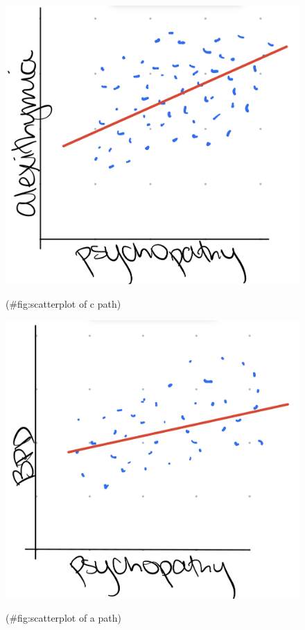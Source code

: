 \documentclass[
  man]{apa6}
\begin{document}
\begin{figure}
\includegraphics[width=1\linewidth]{images/IMG_0419} \caption{ }(\#fig:scatterplot of c path)
\end{figure}

\begin{figure}
\includegraphics[width=1\linewidth]{images/IMG_0420} \caption{ }(\#fig:scatterplot of a path)
\end{figure}
\end{document}
